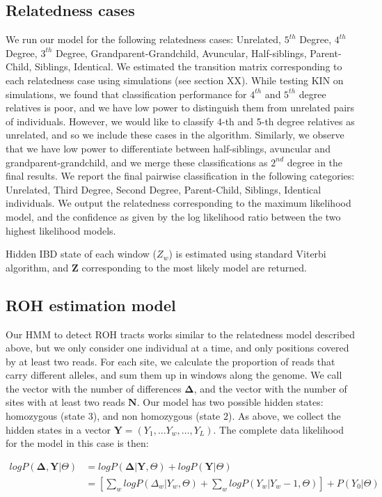 \documentclass[12pt, letterpaper]{article}
\newcommand{\BZ}{\mathbf{Z}}
\begin{document}
\subsection{Relatedness cases}
We run our model for the following relatedness cases: Unrelated, $5^{th}$ Degree, $4^{th}$ Degree, $3^{th}$ Degree, Grandparent-Grandchild, Avuncular, Half-siblings, Parent-Child, Siblings, Identical.
We estimated the transition matrix corresponding to each relatedness case using simulations (see section XX). While testing KIN on simulations, we found that classification performance for $4^{th}$ and $5^{th}$ degree relatives is poor, and we have low power to distinguish them from unrelated pairs of individuals. However, we would like to classify 4-th and 5-th degree relatives as unrelated, and so we include these cases in the algorithm. Similarly, we observe that we have low power to differentiate between half-siblings, avuncular and grandparent-grandchild, and we merge these classifications as $2^{nd}$ degree in the final results. We report the final pairwise classification in the following categories: Unrelated, Third Degree, Second Degree, Parent-Child, Siblings, Identical individuals. We output the relatedness corresponding to the maximum likelihood model, and the confidence as given by the log likelihood ratio between the two highest likelihood models.  

Hidden IBD state of each window ($Z_w$) is estimated using standard Viterbi algorithm, and $\BZ$ corresponding to the most likely model are returned. 

\subsection{ROH estimation model}
Our HMM to detect ROH tracts works similar to the relatedness model described above, but we only consider one individual at a time, and only positions covered by at least two reads. For each site, we calculate the proportion of reads that carry different alleles, and sum them up in windows along the genome. We call the vector with the number of differences $\mathbf{\Delta}$, and the vector with the number of sites with at least two reads $\mathbf{N}$.   Our model has two possible hidden states: homozygous (state $3$), and non homozygous (state $2$). As above, we collect the hidden states in a vector $\mathbf{Y} = (Y_1, \dots Y_w, \dots, Y_L)$. The complete data likelihood for the model in this case is then:

\begin{align}\label{eq:10}
    log P(\mathbf{\Delta},\mathbf{Y}|\Theta) &= log P(\mathbf{\Delta}|\mathbf{Y},\Theta) + log P(\mathbf{Y}|\Theta)\nonumber\\
 &= [\sum_{w} log P(\Delta_w|Y_w, \Theta) + \sum_{w} log P(Y_w|Y_w-1, \Theta)] + P(Y_0| \Theta)
\end{align}
\end{document}
